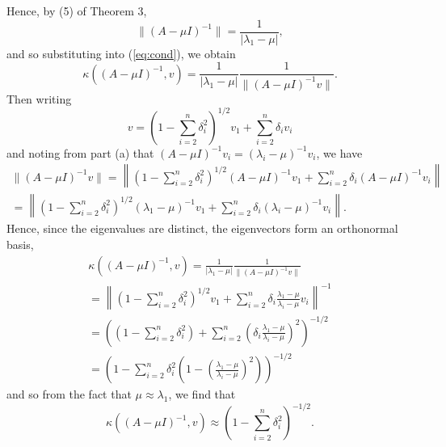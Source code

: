 \documentclass{../../../kin_math}
\begin{document}
\begin{questions}
\begin{enumerate}
\begin{solution}
      Hence, by (5) of Theorem 3,
      \begin{equation*}
        \lVert (A - \mu I)^{-1} \rVert = \frac{1}{|\lambda_1 - \mu|},
      \end{equation*}
      and so substituting into (\ref{eq:cond}), we obtain
      \begin{equation*}
        \kappa((A - \mu I)^{-1}, v) = \frac{1}{|\lambda_1 - \mu|} \frac{1}{\lVert (A - \mu I)^{-1} v \rVert}.
      \end{equation*}
      Then writing
      \begin{equation*}
        v = \left(1- \sum_{i = 2}^n \delta_i^2\right)^{1 / 2} v_1 + \sum_{i = 2}^n \delta_i v_i
      \end{equation*}
      and noting from part (a) that $(A - \mu I)^{-1} v_i = (\lambda_i - \mu)^{-1} v_i$, we have
      \begin{multline*}
        \lVert (A - \mu I)^{-1} v \rVert = \left\lVert \left(1- \sum_{i = 2}^n \delta_i^2\right)^{1 / 2} (A - \mu I)^{-1} v_1 + \sum_{i = 2}^n \delta_i (A - \mu I)^{-1} v_i \right\rVert \\
        = \left\lVert \left(1- \sum_{i = 2}^n \delta_i^2\right)^{1 / 2} (\lambda_1 - \mu)^{-1} v_1 + \sum_{i = 2}^n \delta_i (\lambda_i - \mu)^{-1} v_i \right\rVert.
      \end{multline*}
      Hence, since the eigenvalues are distinct, the eigenvectors form an orthonormal basis,
      \begin{multline*}
        \kappa((A - \mu I)^{-1}, v) = \frac{1}{|\lambda_1 - \mu|} \frac{1}{\lVert (A - \mu I)^{-1} v \rVert} \\
        = \left\lVert \left(1- \sum_{i = 2}^n \delta_i^2\right)^{1 / 2} v_1 + \sum_{i = 2}^n \delta_i \frac{\lambda_1 - \mu}{\lambda_i - \mu} v_i \right\rVert^{-1} \\
        = \left(\left(1- \sum_{i = 2}^n \delta_i^2\right) + \sum_{i = 2}^n \left(\delta_i \frac{\lambda_1 - \mu}{\lambda_i - \mu}\right)^2 \right)^{-1 / 2} \\
        = \left(1- \sum_{i = 2}^n \delta_i^2 \left( 1 - \left(\frac{\lambda_1 - \mu}{\lambda_i - \mu}\right)^2\right) \right)^{-1 / 2}
      \end{multline*}
      and so from the fact that $\mu \approx \lambda_1$, we find that
      \begin{equation*}
        \kappa((A - \mu I)^{-1}, v) \approx \left(1- \sum_{i = 2}^n \delta_i^2\right)^{-1 / 2}.
      \end{equation*}
    \end{solution}

\end{enumerate}
\end{questions}
\end{document}
